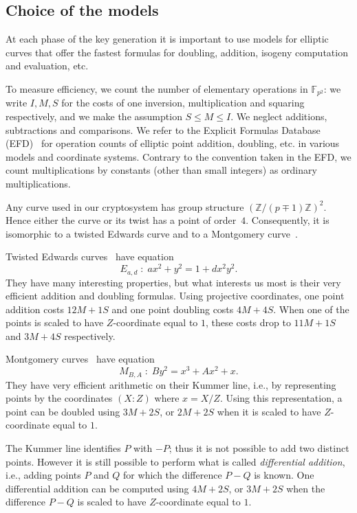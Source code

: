 \documentclass[jmc]{degruyter-journal-a}
\theoremstyle{definition}
\newcommand{\ZZ}{{\mathbb{Z}}}
\newcommand{\FF}{{\mathbb{F}}}
\begin{document}
\subsection{Choice of the models}\label{subsec:montgomery}

At each phase of the key generation it is important to use models for
elliptic curves that offer the fastest formulas for doubling,
addition, isogeny computation and evaluation, etc.

To measure efficiency, we count the number of elementary operations in
$\FF_{p^2}$: we write $I,M,S$ for the costs of one inversion,
multiplication and squaring respectively, and we make the assumption
$S\le M\le I$. We neglect additions, subtractions and comparisons. We
refer to the Explicit Formulas Database (EFD)~\cite{efd} for operation
counts of elliptic point addition, doubling, etc. in various models
and coordinate systems. Contrary to the convention taken in the EFD,
we count multiplications by constants (other than small integers) as
ordinary multiplications.

Any curve used in our cryptosystem has group structure
$\left(\ZZ/(p\mp 1)\ZZ\right)^2$. Hence either the curve or its twist
has a point of order~$4$. Consequently, it is isomorphic to a twisted
Edwards curve and to a Montgomery curve~\cite{twisted-edwards}.

Twisted Edwards curves~\cite{twisted-edwards} have equation
\begin{equation}
  \label{eq:twisted-ed}
  E_{a,d}\;:\;ax^2+y^2=1+dx^2y^2.
\end{equation}
They have many interesting properties, but what interests us most is
their very efficient addition and doubling formulas.  Using projective
coordinates, one point addition costs $12M+1S$ and one point doubling
costs $4M+4S$. When one of the points is scaled to have $Z$-coordinate
equal to $1$, these costs drop to $11M+1S$ and $3M+4S$ respectively.

Montgomery curves~\cite{montgomery} have equation
\begin{equation}
  \label{eq:montgomery}
  M_{B,A}\;:\;By^2 = x^3 + Ax^2 + x.
\end{equation}
They have very efficient arithmetic on their Kummer line, i.e., by
representing points by the coordinates $(X:Z)$ where $x=X/Z$.  Using
this representation, a point can be doubled using $3M+2S$, or $2M+2S$
when it is scaled to have $Z$-coordinate equal to $1$.

The Kummer line identifies $P$ with $-P$; thus it is not possible to
add two distinct points. However it is still possible to perform what
is called \emph{differential addition}, i.e., adding points $P$ and
$Q$ for which the difference $P-Q$ is known. One differential addition
can be computed using $4M+2S$, or $3M+2S$ when the difference $P-Q$ is
scaled to have $Z$-coordinate equal to $1$.
\end{document}
